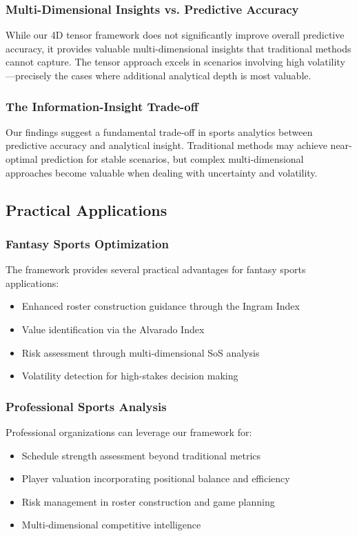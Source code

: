 \documentclass[11pt]{article}
\begin{document}
\subsubsection{Multi-Dimensional Insights vs. Predictive Accuracy}

While our 4D tensor framework does not significantly improve overall predictive accuracy, it provides valuable multi-dimensional insights that traditional methods cannot capture. The tensor approach excels in scenarios involving high volatility—precisely the cases where additional analytical depth is most valuable.

\subsubsection{The Information-Insight Trade-off}

Our findings suggest a fundamental trade-off in sports analytics between predictive accuracy and analytical insight. Traditional methods may achieve near-optimal prediction for stable scenarios, but complex multi-dimensional approaches become valuable when dealing with uncertainty and volatility.

\subsection{Practical Applications}

\subsubsection{Fantasy Sports Optimization}

The framework provides several practical advantages for fantasy sports applications:
\begin{itemize}
    \item Enhanced roster construction guidance through the Ingram Index
    \item Value identification via the Alvarado Index
    \item Risk assessment through multi-dimensional SoS analysis
    \item Volatility detection for high-stakes decision making
\end{itemize}

\subsubsection{Professional Sports Analysis}

Professional organizations can leverage our framework for:
\begin{itemize}
    \item Schedule strength assessment beyond traditional metrics
    \item Player valuation incorporating positional balance and efficiency
    \item Risk management in roster construction and game planning
    \item Multi-dimensional competitive intelligence
\end{itemize}
\end{document}
